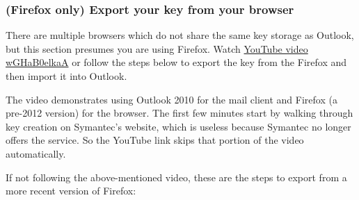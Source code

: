 \documentclass[pdftex,12pt,titlepage=false]{scrartcl}
\begin{document}
\subsubsection{(Firefox only) Export your key from your browser}
There are multiple browsers which do not share the same key storage as
Outlook, but this section presumes you are using Firefox.  Watch
\href{https://www.youtube.com/watch?v=wGHaB0elkaA\&start=226}{YouTube
  video wGHaB0elkaA} or follow the steps below to export the key from
the Firefox and then import it into Outlook.

The video demonstrates using Outlook 2010 for the mail client and
Firefox (a pre-2012 version) for the browser.  The first few minutes
start by walking through key creation on Symantec's website, which is
useless because Symantec no longer offers the service.  So the YouTube
link skips that portion of the video automatically.

If not following the above-mentioned video, these are the steps to
export from a more recent version of Firefox:


\end{document}
